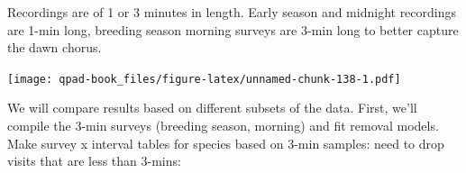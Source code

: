 \documentclass[12pt,]{book}
\newenvironment{Shaded}{\begin{snugshade}}{\end{snugshade}}
\newcommand{\CommentTok}[1]{\textcolor[rgb]{0.56,0.35,0.01}{\textit{#1}}}
\newcommand{\DataTypeTok}[1]{\textcolor[rgb]{0.13,0.29,0.53}{#1}}
\newcommand{\DecValTok}[1]{\textcolor[rgb]{0.00,0.00,0.81}{#1}}
\newcommand{\FloatTok}[1]{\textcolor[rgb]{0.00,0.00,0.81}{#1}}
\newcommand{\KeywordTok}[1]{\textcolor[rgb]{0.13,0.29,0.53}{\textbf{#1}}}
\newcommand{\NormalTok}[1]{#1}
\newcommand{\OperatorTok}[1]{\textcolor[rgb]{0.81,0.36,0.00}{\textbf{#1}}}
\newcommand{\StringTok}[1]{\textcolor[rgb]{0.31,0.60,0.02}{#1}}
\begin{document}
Recordings are of 1 or 3 minutes in length. Early season and midnight
recordings are 1-min long, breeding season morning surveys
are 3-min long to better capture the dawn chorus.

\begin{Shaded}
\end{Shaded}

\texttt{[image: qpad-book\_files/figure-latex/unnamed-chunk-138-1.pdf]}

We will compare results based on different subsets of the data. First,
we'll compile the 3-min surveys (breeding season, morning)
and fit removal models.
Make survey x interval tables for species based on 3-min samples:
need to drop visits that are less than 3-mins:
\end{document}
